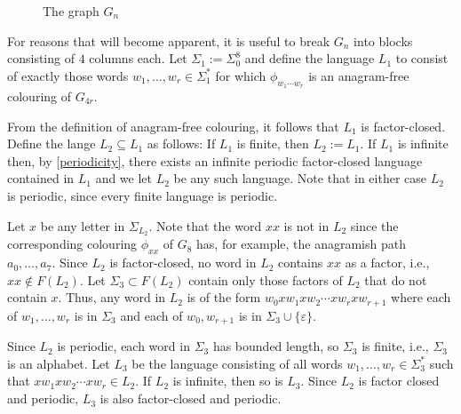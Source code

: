 \documentclass{patmorin}
\DeclareMathOperator{\afcn}{\dot{\chi}_\pi}
\begin{document}
\begin{figure}
    \caption{The graph $G_n$}
    \label{g_n}
\end{figure}



For reasons that will become apparent, it is useful to break $G_n$ into blocks consisting of $4$ columns each.  Let $\Sigma_1:=\Sigma_0^8$ and define the language $L_1$ to consist of exactly those words $w_1,\ldots,w_r\in \Sigma_1^*$ for which $\phi_{w_1\cdots w_r}$ is an anagram-free colouring of $G_{4r}$.

From the definition of anagram-free colouring, it follows that $L_1$ is factor-closed.  Define the lange $L_2\subseteq L_1$ as follows: If $L_1$ is finite, then $L_2:=L_1$.  If $L_1$ is infinite then, by \cref{periodicity}, there exists an infinite periodic factor-closed language contained in $L_1$ and we let $L_2$ be any such language.  Note that in either case $L_2$ is periodic, since every finite language is periodic.  

Let $x$ be any letter in $\Sigma_{L_2}$.  Note that the word $xx$ is not in $L_2$ since the corresponding colouring $\phi_{xx}$ of $G_8$ has, for example, the anagramish path $a_0,\ldots,a_7$.  Since $L_2$ is factor-closed, no word in $L_2$ contains $xx$ as a factor, i.e., $xx\not\in F(L_2)$.  Let $\Sigma_3\subset F(L_2)$ contain only those factors of $L_2$ that do not contain $x$.  Thus, any word in $L_2$ is of the form $w_0xw_1xw_2\cdots xw_rxw_{r+1}$ where each of $w_1,\ldots,w_{r}$ is in $\Sigma_3$ and each of $w_0,w_{r+1}$ is in $\Sigma_3\cup\{\varepsilon\}$.  

Since $L_2$ is periodic, each word in $\Sigma_3$ has bounded length, so $\Sigma_3$ is finite, i.e., $\Sigma_3$ is an alphabet.  Let $L_3$ be the language consisting of all words $w_1,\ldots,w_r\in\Sigma_3^*$ such that $xw_1xw_2\cdots xw_r\in L_2$.  If $L_2$ is infinite, then so is $L_3$.  Since $L_2$ is factor closed and periodic, $L_3$ is also factor-closed and periodic. 

% 
\end{document}
